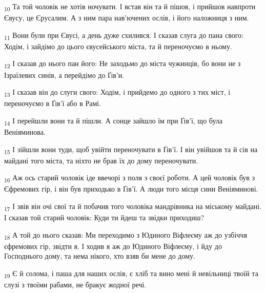 \begin{tcolorbox}
\textsubscript{10} Та той чоловік не хотів ночувати. І встав він та й пішов, і прийшов навпроти Євусу, це Єрусалим. А з ним пара нав'ючених ослів, і його наложниця з ним.
\end{tcolorbox}
\begin{tcolorbox}
\textsubscript{11} Вони були при Євусі, а день дуже схилився. І сказав слуга до пана свого: Ходім, і зайдімо до цього євусейського міста, та й переночуємо в ньому.
\end{tcolorbox}
\begin{tcolorbox}
\textsubscript{12} І сказав до нього пан його: Не заходьмо до міста чужинців, бо вони не з Ізраїлевих синів, а перейдімо до Ґів'и.
\end{tcolorbox}
\begin{tcolorbox}
\textsubscript{13} І сказав він до слуги свого: Ходім, і прийдемо до одного з тих міст, і переночуємо в Ґів'ї або в Рамі.
\end{tcolorbox}
\begin{tcolorbox}
\textsubscript{14} І перейшли вони та й пішли. А сонце зайшло їм при Ґів'ї, що була Веніяминова.
\end{tcolorbox}
\begin{tcolorbox}
\textsubscript{15} І зійшли вони туди, щоб увійти переночувати в Ґів'ї. І він увійшов та й сів на майдані того міста, та ніхто не брав їх до дому переночувати.
\end{tcolorbox}
\begin{tcolorbox}
\textsubscript{16} Аж ось старий чоловік іде ввечорі з поля з своєї роботи. А цей чоловік був з Єфремових гір, і він був приходько в Ґів'ї. А люди того місця сини Веніяминові.
\end{tcolorbox}
\begin{tcolorbox}
\textsubscript{17} І звів він очі свої та й побачив того чоловіка мандрівника на міському майдані. І сказав той старий чоловік: Куди ти йдеш та звідки приходиш?
\end{tcolorbox}
\begin{tcolorbox}
\textsubscript{18} А той до нього сказав: Ми переходимо з Юдиного Віфлеєму аж до узбіччя єфремових гір, звідти я. І ходив я аж до Юдиного Віфлеєму, і йду до Господнього дому, та нема нікого, хто взяв би мене до дому.
\end{tcolorbox}
\begin{tcolorbox}
\textsubscript{19} Є й солома, і паша для наших ослів, є хліб та вино мені й невільниці твоїй та слузі з твоїми рабами, не бракує жодної речі.
\end{tcolorbox}
